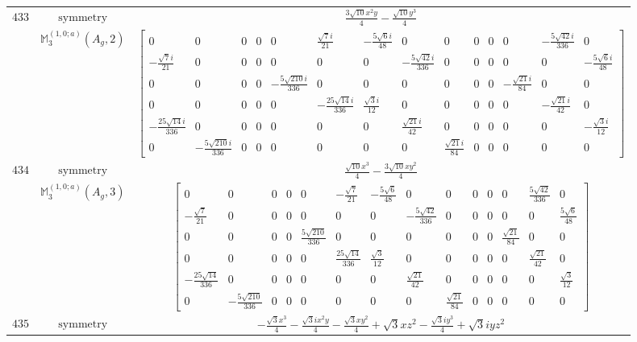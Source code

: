 \documentclass[fleqn,8pt,landscape]{jsarticle}
\begin{document}
\begin{longtable}{ccc}
$ 433 $ & $ \text{symmetry} $ & $ \frac{3 \sqrt{10} x^{2} y}{4} - \frac{\sqrt{10} y^{3}}{4} $ \\
$  $ & $ \mathbb{M}_{3}^{(1,0;a)}(A_{g},2) $ & $ \begin{bmatrix} 0 & 0 & 0 & 0 & 0 & \frac{\sqrt{7} i}{21} & - \frac{5 \sqrt{6} i}{48} & 0 & 0 & 0 & 0 & 0 & - \frac{5 \sqrt{42} i}{336} & 0 \\ - \frac{\sqrt{7} i}{21} & 0 & 0 & 0 & 0 & 0 & 0 & - \frac{5 \sqrt{42} i}{336} & 0 & 0 & 0 & 0 & 0 & - \frac{5 \sqrt{6} i}{48} \\ 0 & 0 & 0 & 0 & - \frac{5 \sqrt{210} i}{336} & 0 & 0 & 0 & 0 & 0 & 0 & - \frac{\sqrt{21} i}{84} & 0 & 0 \\ 0 & 0 & 0 & 0 & 0 & - \frac{25 \sqrt{14} i}{336} & \frac{\sqrt{3} i}{12} & 0 & 0 & 0 & 0 & 0 & - \frac{\sqrt{21} i}{42} & 0 \\ - \frac{25 \sqrt{14} i}{336} & 0 & 0 & 0 & 0 & 0 & 0 & \frac{\sqrt{21} i}{42} & 0 & 0 & 0 & 0 & 0 & - \frac{\sqrt{3} i}{12} \\ 0 & - \frac{5 \sqrt{210} i}{336} & 0 & 0 & 0 & 0 & 0 & 0 & \frac{\sqrt{21} i}{84} & 0 & 0 & 0 & 0 & 0 \end{bmatrix} $ \\ \hline
$ 434 $ & $ \text{symmetry} $ & $ \frac{\sqrt{10} x^{3}}{4} - \frac{3 \sqrt{10} x y^{2}}{4} $ \\
$  $ & $ \mathbb{M}_{3}^{(1,0;a)}(A_{g},3) $ & $ \begin{bmatrix} 0 & 0 & 0 & 0 & 0 & - \frac{\sqrt{7}}{21} & - \frac{5 \sqrt{6}}{48} & 0 & 0 & 0 & 0 & 0 & \frac{5 \sqrt{42}}{336} & 0 \\ - \frac{\sqrt{7}}{21} & 0 & 0 & 0 & 0 & 0 & 0 & - \frac{5 \sqrt{42}}{336} & 0 & 0 & 0 & 0 & 0 & \frac{5 \sqrt{6}}{48} \\ 0 & 0 & 0 & 0 & \frac{5 \sqrt{210}}{336} & 0 & 0 & 0 & 0 & 0 & 0 & \frac{\sqrt{21}}{84} & 0 & 0 \\ 0 & 0 & 0 & 0 & 0 & \frac{25 \sqrt{14}}{336} & \frac{\sqrt{3}}{12} & 0 & 0 & 0 & 0 & 0 & \frac{\sqrt{21}}{42} & 0 \\ - \frac{25 \sqrt{14}}{336} & 0 & 0 & 0 & 0 & 0 & 0 & \frac{\sqrt{21}}{42} & 0 & 0 & 0 & 0 & 0 & \frac{\sqrt{3}}{12} \\ 0 & - \frac{5 \sqrt{210}}{336} & 0 & 0 & 0 & 0 & 0 & 0 & \frac{\sqrt{21}}{84} & 0 & 0 & 0 & 0 & 0 \end{bmatrix} $ \\ \hline
$ 435 $ & $ \text{symmetry} $ & $ - \frac{\sqrt{3} x^{3}}{4} - \frac{\sqrt{3} i x^{2} y}{4} - \frac{\sqrt{3} x y^{2}}{4} + \sqrt{3} x z^{2} - \frac{\sqrt{3} i y^{3}}{4} + \sqrt{3} i y z^{2} $ \\

\end{longtable}
\end{document}

